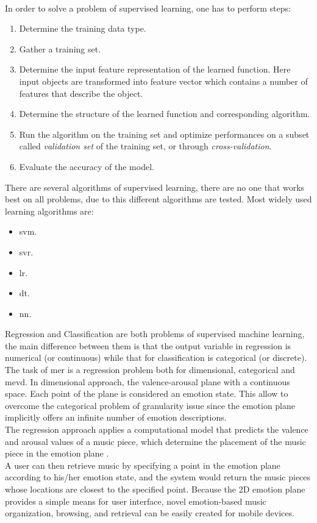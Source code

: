 \\
In order to solve a problem of supervised learning, one has to perform steps:
\begin{enumerate}
	\item Determine the training data type.
	\item Gather a training set.
	\item Determine the input feature representation of the learned function. Here input objects are transformed into feature vector which contains a number of features that describe the object.
	\item Determine the structure of the learned function and corresponding algorithm.
	\item Run the algorithm on the training set and optimize performances on a subset called \textit{validation set} of the training set, or through \textit{cross-validation}.
	\item Evaluate the accuracy of the model.
\end{enumerate}
There are several algorithms of supervised learning, there are no one that works best on all problems, due to this different algorithms are tested. Most widely used learning algorithms are:
\begin{itemize}
	\item \gls{svm}.
	\item \gls{svr}.
	\item \gls{lr}.
	\item \gls{dt}.
	\item \gls{nn}.
\end{itemize}
Regression and Classification are both problems of supervised machine learning, the main difference between them is that the output variable in regression is numerical (or continuous) while that for classification is categorical (or discrete).
\\ \indent
The task of \gls{mer} is a regression problem both for dimensional, categorical and \gls{mevd}. In dimensional approach, the valence-arousal plane with a continuous space. Each point of the plane is considered an emotion state. This allow to overcome the categorical problem of granularity issue since the emotion plane implicitly offers an infinite number of emotion descriptions.
\\
The regression approach applies a computational model that predicts the valence and arousal values of a music piece, which determine the placement of the music piece in the emotion plane \cite{yang2011music}.
\\ \indent
A user can then retrieve music by specifying a point in the emotion plane according to his/her emotion state, and the system would return the music pieces whose locations are closest to the specified point. Because the 2D emotion plane provides a simple means for user interface, novel emotion-based music organization, browsing, and retrieval can be easily created for mobile devices.

